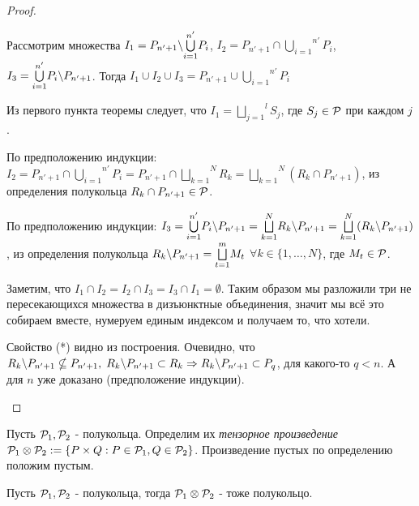 \begin{proof}
\begin{enumerate}
\begin{itemize}
        Рассмотрим множества $I_1 = P_{n' + 1} \backslash \overset{n'}{\underset{i = 1}{\bigcup}}P_i$, $I_2 = P_{n' + 1} \cap \overset{n'}{\underset{i = 1}{\bigcup}}P_i$, $I_3 = \overset{n'}{\underset{i = 1}{\bigcup}}P_i \backslash P_{n' + 1}$. Тогда $I_1 \cup I_2 \cup I_3 = P_{n' + 1} \cup \overset{n'}{\underset{i = 1}{\bigcup}}P_i$

        Из первого пункта теоремы следует, что $I_1 = \overset{l}{\underset{j = 1}{\bigsqcup}}S_j$, где $S_j \in \mathcal{P}$ при каждом $j$.

        По предположению индукции: $I_2 = P_{n' + 1} \cap \overset{n'}{\underset{i = 1}{\bigcup}}P_i = P_{n' + 1} \cap \overset{N}{\underset{k = 1}{\bigsqcup}} R_k = \overset{N}{\underset{k = 1}{\bigsqcup}} (R_k \cap P_{n' + 1})$, из определения полукольца $R_k \cap P_{n' + 1} \in \mathcal{P}$.

        По предположению индукции: $I_3 = \overset{n'}{\underset{i = 1}{\bigcup}}P_i \backslash P_{n' + 1} = \overset{N}{\underset{k = 1}{\bigsqcup}} R_k \backslash P_{n' + 1} = \overset{N}{\underset{k = 1}{\bigsqcup}} (R_k \backslash P_{n' + 1})$, из определения полукольца $R_k \backslash P_{n' + 1} = \overset{m}{\underset{t = 1}{\bigsqcup}} M_t$ $\forall k \in \{1, \dots, N\}$, где $M_t \in \mathcal{P}$.

        Заметим, что $I_1 \cap I_2 = I_2 \cap I_3 = I_3 \cap I_1 = \emptyset$. Таким образом мы разложили три не пересекающихся множества в дизъюнктные объединения, значит мы всё это собираем вместе, нумеруем единым индексом и получаем то, что хотели.
    \end{itemize}
    Свойство (*) видно из построения. Очевидно, что $R_k \backslash P_{n' + 1} \nsubseteq P_{n' + 1}, \; R_k \backslash P_{n' + 1} \subset R_k \Rightarrow R_k \backslash P_{n' + 1} \subset P_q$, для какого-то $q < n$. А для $n$ уже доказано (предположение индукции).
\end{enumerate}
\end{proof}

 Пусть $\mathcal{P}_1, \mathcal{P}_2$ - полукольца. Определим их \textit{тензорное произведение} $\mathcal{P}_1 \otimes \mathcal{P}_2 := \{P \times Q : P \in \mathcal{P}_1, Q \in \mathcal{P}_2\}$. Произведение пустых по определению положим пустым.

\theorem Пусть $\mathcal{P}_1, \mathcal{P}_2$ - полукольца, тогда $\mathcal{P}_1 \otimes \mathcal{P}_2$ - тоже полукольцо.

